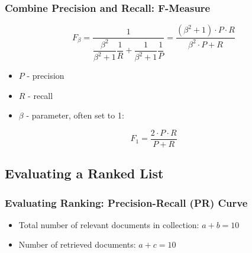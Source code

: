 \subsubsection{Combine Precision and Recall: F-Measure}

\begin{equation*}
F_\beta = \frac{1}{\dfrac{\beta^2}{\beta^2+1}\dfrac{1}{R} + \dfrac{1}{\beta^2+1}\dfrac{1}{P}} = \frac{(\beta^2+1)\cdot P \cdot R}{\beta^2 \cdot P + R}
\end{equation*}

\begin{itemize}
\item $P$ - precision
\item $R$ - recall
\item $\beta$ - parameter, often set to 1:
\end{itemize}

\begin{equation*}
F_1 = \dfrac{2 \cdot P \cdot R}{P+R}
\end{equation*}


\newpage
\subsection{Evaluating a Ranked List}
\subsubsection{Evaluating Ranking: Precision-Recall (PR) Curve}
\begin{itemize}
\item Total number of relevant documents in collection: $a+b = 10$
\item Number of retrieved documents: $a+c = 10$
\end{itemize}

